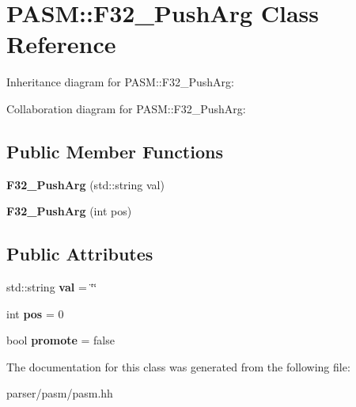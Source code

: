 \hypertarget{classPASM_1_1F32__PushArg}{}\section{P\+A\+SM\+:\+:F32\+\_\+\+Push\+Arg Class Reference}
\label{classPASM_1_1F32__PushArg}


Inheritance diagram for P\+A\+SM\+:\+:F32\+\_\+\+Push\+Arg\+:


Collaboration diagram for P\+A\+SM\+:\+:F32\+\_\+\+Push\+Arg\+:
\subsection*{Public Member Functions}
\begin{DoxyCompactItemize}
\item 
\mbox{\label{classPASM_1_1F32__PushArg_a6bce480f8f21a972ae420ab1dd46b476}} 
{\bfseries F32\+\_\+\+Push\+Arg} (std\+::string val)
\item 
\mbox{\label{classPASM_1_1F32__PushArg_ae834dc12cac2a174909b03dcc49e0cb1}} 
{\bfseries F32\+\_\+\+Push\+Arg} (int pos)
\end{DoxyCompactItemize}
\subsection*{Public Attributes}
\begin{DoxyCompactItemize}
\item 
\mbox{\label{classPASM_1_1F32__PushArg_af339c6516ecae9a5bf68fd436339caab}} 
std\+::string {\bfseries val} = \char`\"{}\char`\"{}
\item 
\mbox{\label{classPASM_1_1F32__PushArg_a4301822c367c143489308f3743971d62}} 
int {\bfseries pos} = 0
\item 
\mbox{\label{classPASM_1_1F32__PushArg_ad3c9d0bbe4be336738b15ddb3cb37199}} 
bool {\bfseries promote} = false
\end{DoxyCompactItemize}


The documentation for this class was generated from the following file\+:\begin{DoxyCompactItemize}
\item 
parser/pasm/pasm.\+hh\end{DoxyCompactItemize}
